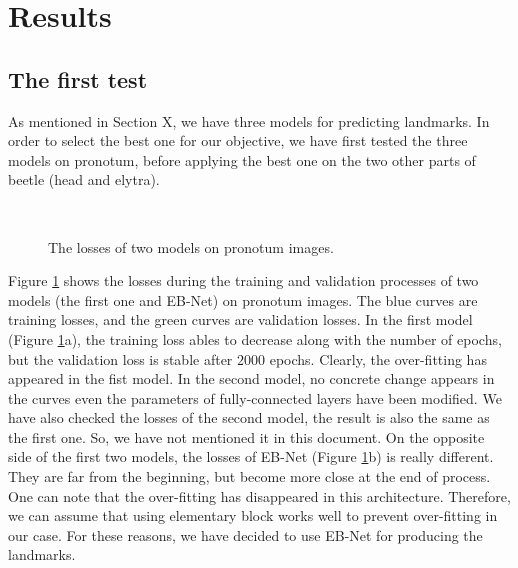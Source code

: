 \documentclass[review]{elsarticle}
\begin{document}
\section{Results}
\subsection{The first test}
As mentioned in Section X, we have three models for predicting landmarks. In order to select the best one for our objective, we have first tested the three models on pronotum, before applying the best one on the two other parts of beetle (head and elytra).

\begin{figure}[h!]
    \centering
    ~~
    \caption{The losses of two models on pronotum images.}
    \label{figdlosses}
\end{figure}

Figure \ref{figdlosses} shows the losses during the training and validation processes of two models (the first one and EB-Net) on pronotum images. The blue curves are training losses, and the green curves are validation losses. In the first model (Figure \ref{figdlosses}a), the training loss ables to decrease along with the number of epochs, but the validation loss is stable after $2000$ epochs. Clearly, the over-fitting has appeared in the fist model. In the second model, no concrete change appears in the curves even the parameters of fully-connected layers have been modified. We have also checked the losses of the second model, the result is also the same as the first one. So, we have not mentioned it in this document. On the opposite side of the first two models, the losses of EB-Net (Figure \ref{figdlosses}b) is really different. They are far from the beginning, but become more close at the end of process. One can note that the over-fitting has disappeared in this architecture. Therefore, we can assume that using elementary block works well to prevent over-fitting in our case. For these reasons, we have decided to use EB-Net for producing the landmarks.
\end{document}

